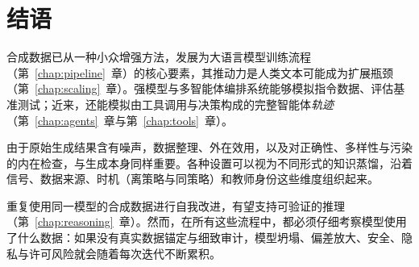 \section{结语}
合成数据已从一种小众增强方法，发展为大语言模型训练流程（第~\ref{chap:pipeline}~章）的核心要素，其推动力是人类文本可能成为扩展瓶颈（第~\ref{chap:scaling}~章）。强模型与多智能体编排系统能够模拟指令数据、评估基准测试；近来，还能模拟由工具调用与决策构成的完整智能体{\em 轨迹}（第~\ref{chap:agents}~章与第~\ref{chap:tools}~章）。

由于原始生成结果含有噪声，数据整理、外在效用，以及对正确性、多样性与污染的内在检查，与生成本身同样重要。各种设置可以视为不同形式的知识蒸馏，沿着信号、数据来源、时机（离策略与同策略）和教师身份这些维度组织起来。

重复使用同一模型的合成数据进行自我改进，有望支持可验证的推理（第~\ref{chap:reasoning}~章）。然而，在所有这些流程中，都必须仔细考察模型使用了什么数据：如果没有真实数据锚定与细致审计，模型坍塌、偏差放大、安全、隐私与许可风险就会随着每次迭代不断累积。



